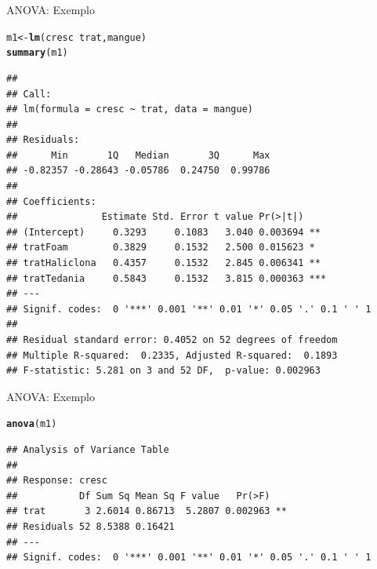 \documentclass{beamer}\usepackage[]{graphicx}\usepackage[]{color}
\makeatletter
\newcommand{\hlopt}[1]{\textcolor[rgb]{0,0,0}{#1}}%
\newcommand{\hlstd}[1]{\textcolor[rgb]{0.345,0.345,0.345}{#1}}%
\newcommand{\hlkwb}[1]{\textcolor[rgb]{0.69,0.353,0.396}{#1}}%
\newcommand{\hlkwd}[1]{\textcolor[rgb]{0.737,0.353,0.396}{\textbf{#1}}}%
\newenvironment{kframe}{%
 \def\at@end@of@kframe{}%
 \ifinner\ifhmode%
  \def\at@end@of@kframe{\end{minipage}}%
  \begin{minipage}{\columnwidth}%
 \fi\fi%
 \def\FrameCommand##1{\hskip\@totalleftmargin \hskip-\fboxsep
 \colorbox{shadecolor}{##1}\hskip-\fboxsep
     \hskip-\linewidth \hskip-\@totalleftmargin \hskip\columnwidth}%
 \MakeFramed {\advance\hsize-\width
   \@totalleftmargin\z@ \linewidth\hsize
   \@setminipage}}%
 {\par\unskip\endMakeFramed%
 \at@end@of@kframe}
\newenvironment{knitrout}{}{} %
\renewenvironment{knitrout}{\setlength{\topsep}{0mm}}{}
\makeatother
\begin{document}
\begin{frame}[fragile]{ANOVA: Exemplo}

\begin{knitrout}\tiny
{}\color{fgcolor}\begin{kframe}
\begin{alltt}
\hlstd{m1} \hlkwb{<-} \hlkwd{lm}\hlstd{(cresc} \hlopt{~} \hlstd{trat,mangue)}
\hlkwd{summary}\hlstd{(m1)}
\end{alltt}
\begin{verbatim}
## 
## Call:
## lm(formula = cresc ~ trat, data = mangue)
## 
## Residuals:
##      Min       1Q   Median       3Q      Max 
## -0.82357 -0.28643 -0.05786  0.24750  0.99786 
## 
## Coefficients:
##               Estimate Std. Error t value Pr(>|t|)    
## (Intercept)     0.3293     0.1083   3.040 0.003694 ** 
## tratFoam        0.3829     0.1532   2.500 0.015623 *  
## tratHaliclona   0.4357     0.1532   2.845 0.006341 ** 
## tratTedania     0.5843     0.1532   3.815 0.000363 ***
## ---
## Signif. codes:  0 '***' 0.001 '**' 0.01 '*' 0.05 '.' 0.1 ' ' 1
## 
## Residual standard error: 0.4052 on 52 degrees of freedom
## Multiple R-squared:  0.2335,	Adjusted R-squared:  0.1893 
## F-statistic: 5.281 on 3 and 52 DF,  p-value: 0.002963
\end{verbatim}
\end{kframe}
\end{knitrout}

\end{frame}

\begin{frame}[fragile]{ANOVA: Exemplo}

\begin{knitrout}\tiny
{}\color{fgcolor}\begin{kframe}
\begin{alltt}
\hlkwd{anova}\hlstd{(m1)}
\end{alltt}
\begin{verbatim}
## Analysis of Variance Table
## 
## Response: cresc
##           Df Sum Sq Mean Sq F value   Pr(>F)   
## trat       3 2.6014 0.86713  5.2807 0.002963 **
## Residuals 52 8.5388 0.16421                    
## ---
## Signif. codes:  0 '***' 0.001 '**' 0.01 '*' 0.05 '.' 0.1 ' ' 1
\end{verbatim}
\end{kframe}
\end{knitrout}

\end{frame}
\end{document}

